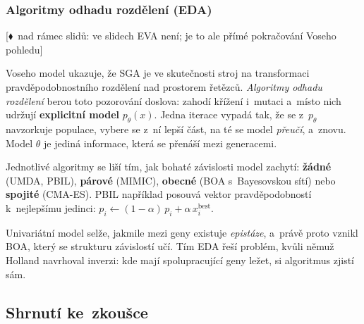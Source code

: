 \documentclass[11pt,a4paper]{article}
\theoremstyle{definition}
\newcommand{\mimoq}[1]{\textcolor{markcol}{\textsf{\footnotesize[$\blacklozenge$~nad rámec slidů: #1]}}}
\begin{document}
\subsubsection{Algoritmy odhadu rozdělení (EDA)}
\label{ssec:eda}

\noindent\mimoq{ve slidech EVA není; je to ale přímé pokračování Voseho pohledu}

\begin{defbox}
Voseho model ukazuje, že SGA je ve skutečnosti stroj na transformaci pravděpodobnostního
rozdělení nad prostorem řetězců. \emph{Algoritmy odhadu rozdělení} berou toto pozorování
doslova: zahodí křížení i~mutaci a~místo nich udržují \textbf{explicitní model}
$p_\theta(x)$. Jedna iterace vypadá tak, že se z~$p_\theta$ navzorkuje populace, vybere
se z~ní lepší část, na té se model \emph{přeučí}, a~znovu. Model $\theta$ je jediná
informace, která se přenáší mezi generacemi.

Jednotlivé algoritmy se liší tím, jak bohaté závislosti model zachytí: \textbf{žádné}
(UMDA, PBIL), \textbf{párové} (MIMIC), \textbf{obecné} (BOA s~Bayesovskou sítí) nebo
\textbf{spojité} (CMA-ES). PBIL například posouvá vektor pravděpodobností k~nejlepšímu
jedinci: $p_i \gets (1-\alpha)\,p_i + \alpha\, x_i^{\mathrm{best}}$.
\end{defbox}

Univariátní model selže, jakmile mezi geny existuje \emph{epistáze}, a~právě proto
vznikl BOA, který se strukturu závislostí učí. Tím EDA řeší problém, kvůli němuž Holland
navrhoval inverzi: kde mají spolupracující geny ležet, si algoritmus zjistí sám.

\subsection{Shrnutí ke~zkoušce}
\end{document}
